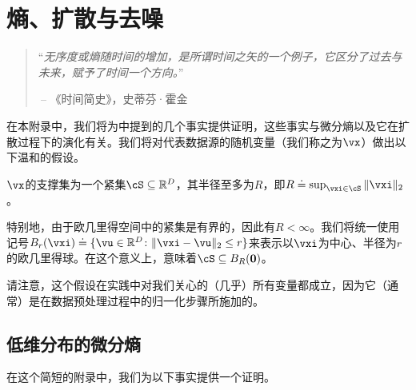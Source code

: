 \documentclass[../../book-main.tex]{subfiles}
\begin{document}
\chapter{熵、扩散与去噪}\label{app:entropy}\label{app:diffusion-denoising}

\begin{quote}
``{\em 无序度或熵随时间的增加，是所谓时间之矢的一个例子，它区分了过去与未来，赋予了时间一个方向。}''

$~$\hfill -- 《时间简史》，史蒂芬·霍金
 \end{quote}
\vspace{5mm}

在本附录中，我们将为中提到的几个事实提供证明，这些事实与微分熵以及它在扩散过程下的演化有关。我们将对代表数据源的随机变量（我们称之为\(\vx\)）做出以下温和的假设。

\begin{assumption}\label{assumption:entropy_x_compact_support}
    \(\vx\)的支撑集为一个紧集\(\cS \subseteq \R^{D}\)，其半径至多为\(R\)，即\(R \doteq \sup_{\vxi \in \cS}\norm{\vxi}_{2}\)。
\end{assumption}

特别地，由于欧几里得空间中的紧集是有界的，因此有\(R < \infty\)。我们将统一使用记号\(B_{r}(\vxi) \doteq \{\vu \in \R^{D} \colon \norm{\vxi - \vu}_{2} \leq r\}\)来表示以\(\vxi\)为中心、半径为\(r\)的欧几里得球。在这个意义上，意味着\(\cS \subseteq B_{R}(\vzero)\)。

请注意，这个假设在实践中对我们关心的（几乎）所有变量都成立，因为它（通常）是在数据预处理过程中的归一化步骤所施加的。

\section{低维分布的微分熵}\label{sec:low_dim_entropy}

在这个简短的附录中，我们为以下事实提供一个证明。
\end{document}
